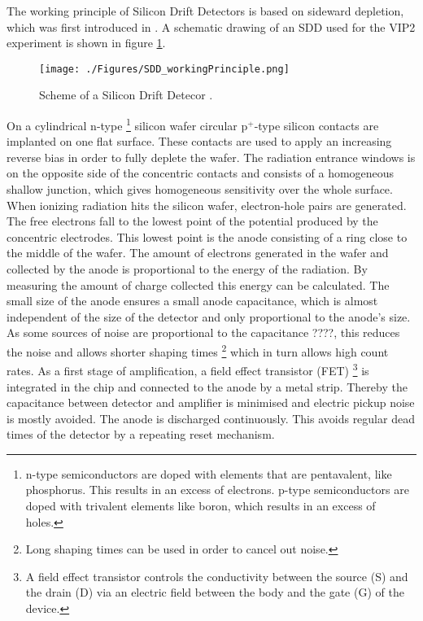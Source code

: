 The working principle of Silicon Drift Detectors is based on sideward depletion, which was first introduced in \cite{Gatti1984}. A schematic drawing of an SDD used for the VIP2 experiment is shown in figure \ref{fig:SDD_WorkingPrinciple}.
\begin{figure}[h]
 \centering
 \texttt{[image: ./Figures/SDD\_workingPrinciple.png]}
 \caption{Scheme of a Silicon Drift Detecor \cite{Lechner}.}
 \label{fig:SDD_WorkingPrinciple}
\end{figure}
On a cylindrical n-type \footnote{n-type semiconductors are doped with elements that are pentavalent, like phosphorus. This results in an excess of electrons. p-type semiconductors are doped with trivalent elements like boron, which results in an excess of holes.} silicon wafer circular p$^{+}$-type silicon contacts are implanted on one flat surface. These contacts are used to apply an increasing reverse bias in order to fully deplete the wafer. The radiation entrance windows is on the opposite side of the concentric contacts and consists of a homogeneous shallow junction, which gives homogeneous sensitivity over the whole surface. When ionizing radiation hits the silicon wafer, electron-hole pairs are generated. The free electrons fall to the lowest point of the potential produced by the concentric electrodes. This lowest point is the anode consisting of a ring close to the middle of the wafer. The amount of electrons generated in the wafer and collected by the anode is proportional to the energy of the radiation. By measuring the amount of charge collected this energy can be calculated. The small size of the anode ensures a small anode capacitance, which is almost independent of the size of the detector \cite{Cargnelli2005} and only proportional to the anode's size. As some sources of noise are proportional to the capacitance ????, this reduces the noise and allows shorter shaping times \footnote{Long shaping times can be used in order to cancel out noise.} which in turn allows high count rates. As a first stage of amplification, a field effect transistor (FET) \footnote{A field effect transistor controls the conductivity between the source (S) and the drain (D) via an electric field between the body and the gate (G) of the device.} is integrated in the chip and connected to the anode by a metal strip. Thereby the capacitance between detector and amplifier is minimised and electric pickup noise is mostly avoided. The anode is discharged continuously. This avoids regular dead times of the detector by a repeating reset mechanism.

